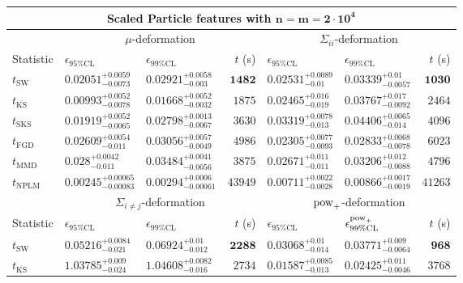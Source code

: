 \begin{tabular}{l|llr|llr}
	\toprule
	\multicolumn{7}{c}{{\bf Scaled Particle features with $\mathbf{n=m=2\cdot 10^{4}}$}} \\
	\toprule
	\multicolumn{1}{c}{} & \multicolumn{3}{c}{$\mu$-deformation} & \multicolumn{3}{c}{$\Sigma_{ii}$-deformation} \\
	Statistic & $\epsilon_{95\%\mathrm{CL}}$ & $\epsilon_{99\%\mathrm    {CL}}$ & $t$ (s) & $\epsilon_{95\%\mathrm{CL}}$ & $\epsilon_{99\%\mathrm{CL}}$ & $t$ (s) \\
	\midrule
	$t_{\mathrm{SW}}$ & $0.02051_{-0.0073}^{+0.0059}$ & $0.02921_{-0.003}^{+0.0058}$ & ${\mathbf{1482}}$ & $0.02531_{-0.01}^{+0.0089}$ & $0.03339_{-0.0057}^{+0.01}$ & ${\mathbf{1030}}$ \\
	$t_{\overline{\mathrm{KS}}}$ & ${\mathbf{0.00993_{-0.0078}^{+0.0052}}}$ & ${\mathbf{0.01668_{-0.0032}^{+0.0052}}}$ & $1875$ & $0.02465_{-0.019}^{+0.016}$ & $0.03767_{-0.0092}^{+0.017}$ & $2464$ \\
	$t_{\mathrm{SKS}}$ & $0.01919_{-0.0065}^{+0.0052}$ & $0.02798_{-0.0067}^{+0.0013}$ & $3630$ & $0.03319_{-0.013}^{+0.0078}$ & $0.04406_{-0.014}^{+0.0065}$ & $4096$ \\
	$t_{\mathrm{FGD}}$ & $0.02609_{-0.011}^{+0.0054}$ & $0.03056_{-0.0049}^{+0.0057}$ & $4986$ & ${\mathbf{0.02305_{-0.0093}^{+0.0077}}}$ & ${\mathbf{0.02833_{-0.0078}^{+0.0068}}}$ & $6023$ \\
	$t_{\mathrm{MMD}}$ & $0.028_{-0.011}^{+0.0042}$ & $0.03484_{-0.0056}^{+0.0041}$ & $3875$ & $0.02671_{-0.011}^{+0.011}$ & $0.03206_{-0.0088}^{+0.012}$ & $4796$ \\
\rowcolor{red!35}	$t_{\mathrm{NPLM}}$ & $0.00245_{-0.00083}^{+0.00065}$ & $0.00294_{-0.00061}^{+0.0006}$ & $43949$ & $0.00711_{-0.0028}^{+0.0022}$ & $0.00866_{-0.0019}^{+0.0017}$ & $41263$ \\
	\toprule
	\multicolumn{1}{c}{} & \multicolumn{3}{c}{$\Sigma_{i\neq j}$-deformation} & \multicolumn{3}{c}{$\rm{pow}_{+}$-deformation} \\
	Statistic & $\epsilon_{95\%\mathrm{CL}}$ & $\epsilon_{99\%\mathrm{CL}}$ & $t$ (s) & $\epsilon_{95\%\mathrm{CL}}$ & $\epsilon^{\rm   {pow}_{+}}_{99\%\mathrm{CL}}$ & $t$ (s) \\
	\midrule
	$t_{\mathrm{SW}}$ & $0.05216_{-0.021}^{+0.0084}$ & $0.06924_{-0.012}^{+0.01}$ & ${\mathbf{2288}}$ & $0.03068_{-0.014}^{+0.01}$ & $0.03771_{-0.0064}^{+0.009}$ & ${\mathbf{968}}$ \\
	$t_{\overline{\mathrm{KS}}}$ & $1.03785_{-0.024}^{+0.009}$ & $1.04608_{-0.016}^{+0.0082}$ & $2734$ & ${\mathbf{0.01587_{-0.013}^{+0.0085}}}$ & ${\mathbf{0.02425_{-0.0046}^{+0.011}}}$ & $3768$ \\

\end{tabular}
